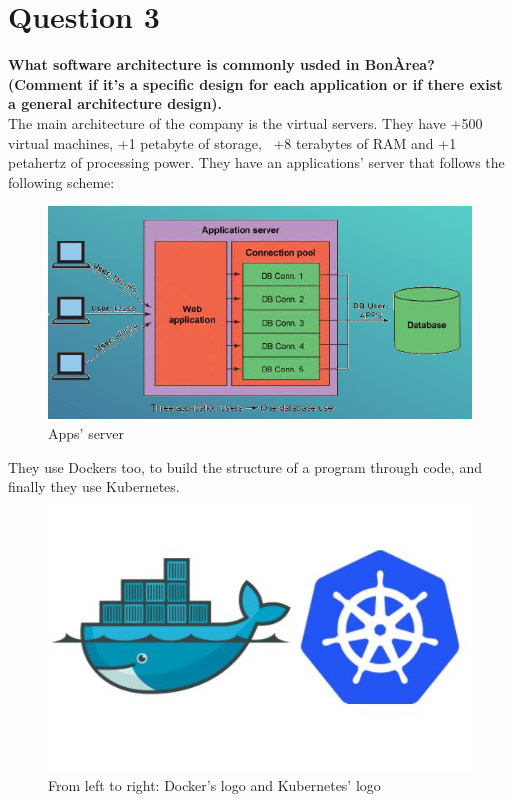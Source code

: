 \documentclass[12pt]{article}
\begin{document}
\section*{Question 3}
\textbf{What software architecture is commonly usded in BonÀrea? (Comment if it's a specific design for each application or if there exist a general architecture design).}\\
The main architecture of the company is the virtual servers. They have +500 virtual machines, +1 petabyte of storage,  +8 terabytes of RAM and +1 petahertz of processing power.
They have an applications' server that follows the following scheme:
\begin{figure}[H]
    \centering
    \includegraphics[scale = 0.7]{Images/image_2022-11-28_204332349.png}
    \caption{Apps' server}
    \label{fig:app_server}
\end{figure}
They use Dockers too, to build the structure of a program through code, and finally they use Kubernetes.
\begin{figure}[H]
    \centering
    \includegraphics[scale = 0.7]{Images/dockerkubernetes.jpg}
    \caption{From left to right: Docker's logo and Kubernetes' logo}
    \label{fig:dockerkubernetes}
\end{figure}
\end{document}
